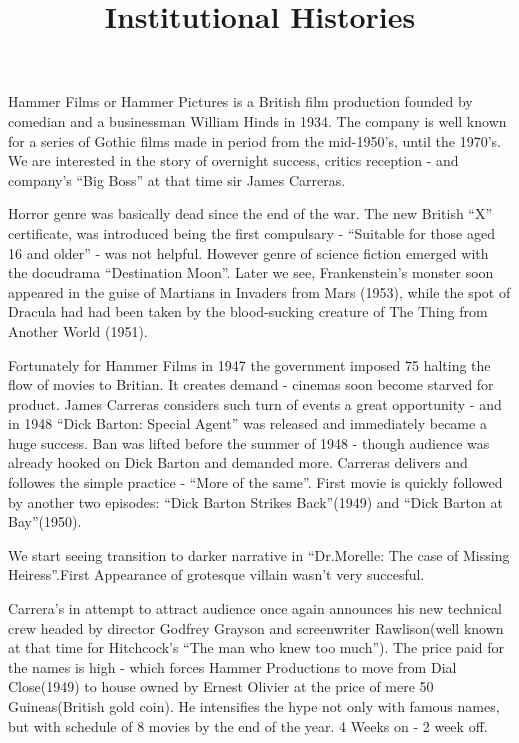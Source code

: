 \documentclass{article}
\title{Institutional Histories}
\begin{document}
\makeheader

Hammer Films or Hammer Pictures is a British film
production founded by comedian and a businessman William
Hinds in 1934. The company is well known for a series of
Gothic films made in period from the mid-1950's, until
the 1970's. We are interested in the story of overnight
success, critics reception - and company's ``Big Boss''
at that time sir James Carreras.  

Horror genre was basically dead since the end of the war.
The new British ``X'' certificate, was introduced being
the first compulsary - ``Suitable for those aged 16 and
older'' - was not helpful. However genre of science
fiction emerged with the docudrama ``Destination Moon''.
Later we see, Frankenstein’s monster soon appeared in the guise of Martians in Invaders
from Mars (1953), while the spot of Dracula had
had been taken by the blood-sucking creature of
The Thing from Another World (1951).  

Fortunately for Hammer Films in 1947 the government
imposed 75%
halting the flow of movies to Britian. It creates demand -
cinemas soon become starved for product. James Carreras
considers such turn of events a great opportunity - and
in 1948 ``Dick Barton: Special Agent'' was released and
immediately became a huge success. Ban was lifted before
the summer of 1948 - though audience was already hooked on
Dick Barton and demanded more. Carreras delivers
and followes the simple practice - ``More of the same''.
First movie is quickly followed by another two episodes: 
``Dick Barton Strikes Back''(1949) and ``Dick Barton at
Bay''(1950).  

We start seeing transition to darker narrative in
``Dr.Morelle: The case of Missing Heiress''.First
Appearance of grotesque villain wasn't very succesful.  

Carrera's in attempt to attract audience once again
announces his new technical crew headed by director
Godfrey Grayson and screenwriter Rawlison(well known
at that time for Hitchcock's ``The man who knew too
much''). The price paid for the names is high - which
forces Hammer Productions to move from Dial Close(1949)
to house owned by Ernest Olivier at the price of mere
50 Guineas(British gold coin). He intensifies the hype
not only with famous names, but with schedule of 8 movies
by the end of the year. 4 Weeks on -  2 week off.

\makeworkscited
\end{document}
